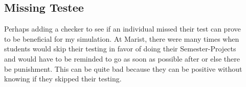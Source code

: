 \documentclass[letterpaper, 10pt]{article}
\begin{document}
\subsection{Missing Testee}
Perhaps adding a checker to see if an individual missed their test can prove\\
to be beneficial for my simulation. At Marist, there were many times when \\
students would skip their testing in favor of doing their Semester-Projects \\
and would have to be reminded to go as soon as possible after or else there \\
be punishment. This can be quite bad because they can be positive without \\
knowing if they skipped their testing.\\
\end{document}
